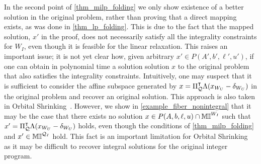 \documentclass[pdflatex,sn-mathphys-num]{sn-jnl}%
\theoremstyle{thmstyleone}%
\theoremstyle{thmstylethree}%
\theoremstyle{thmstyletwo}%
\begin{document}
In the second point of \cref{thm_milp_folding} we only show existence of a better solution in the original problem, rather than proving that a direct mapping exists, as was done in \cref{thm_lp_folding}. This is due to the fact that the mapped solution, $x'$ in the proof, does not necessarily satisfy all the integrality constraints for $W_I$, even though it is feasible for the linear relaxation. This raises an important issue; it is not yet clear how, given arbitrary $x'\in P(A',b',\ell',u')$, if one can obtain in polynomial time a solution solution $x$ to the original problem that also satisfies the integrality constraints. Intuitively, one may suspect that it is sufficient to consider the affine subspace generated by $x = \Pi_{\mathcal{Q}}^{\intercal} \Lambda (x_{W_U} - \delta_{W_U})$ in the original problem and recover an original solution. This approach is also taken in Orbital Shrinking~\cite{Fischetti2017}. However, we show in \cref{example_fiber_nonintegral} that it may be the case that there exists no solution $x\in P(A,b,\ell,u) \cap \mathbb{MI}^{W_I}$ such that $x' = \Pi_{\mathcal{Q}}^{\intercal} \Lambda (x_{W_U} - \delta_{W_U})$ holds, even though the conditions of \cref{thm_milp_folding} and $x'\in \mathbb{MI}^{\mathcal{Q}_I}$ hold. This fact is an important limitation for Orbital Shrinking~\cite{Fischetti2017} as it may be difficult to recover integral solutions for the original integer program.
\end{document}

